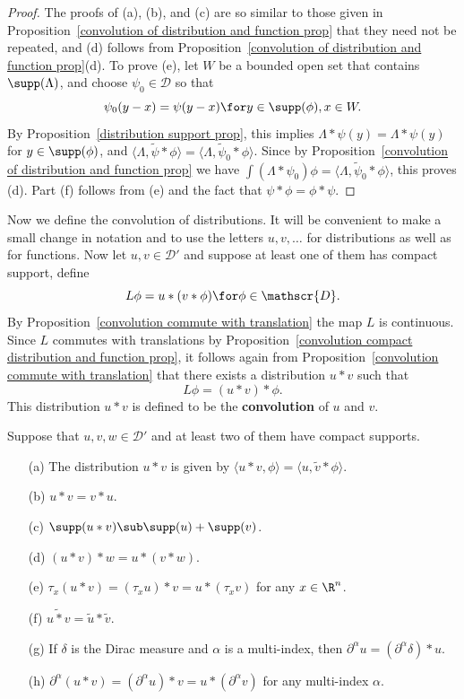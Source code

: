 \begin{proof}
The proofs of (a), (b), and (c) are so similar to those given in Proposition~\ref{convolution of distribution and function prop} that they need not be repeated, and (d) follows from Proposition~\ref{convolution of distribution and function prop}(d). To prove (e), let $W$ be a bounded open set that contains $\supp(\Lambda)$, and choose $\psi_0\in\mathscr{D}$ so that
\[\psi_0(y-x)=\psi(y-x)\for y\in\supp(\phi),x\in W.\]
By Proposition~\ref{distribution support prop}, this implies $\Lambda\ast\psi(y)=\Lambda\ast\psi(y)$ for $y\in\supp(\phi)$, and $\langle\Lambda,\tilde{\psi}\ast\phi\rangle=\langle\Lambda,\tilde{\psi}_0\ast\phi\rangle$. Since by Proposition~\ref{convolution of distribution and function prop} we have $\int(\Lambda\ast\psi_0)\phi=\langle\Lambda,\tilde{\psi}_0\ast\phi\rangle$, this proves (d). Part (f) follows from (e) and the fact that $\psi\ast\phi=\phi\ast\psi$.
\end{proof}
Now we define the convolution of distributions. It will be convenient to make a small change in notation and to use the letters $u,v,\dots$ for distributions as well as for functions. Now let $u,v\in\mathscr{D}'$ and suppose at least one of them has compact support, define
\[L\phi=u\ast(v\ast\phi)\for \phi\in\mathscr{D}.\]
By Proposition~\ref{convolution commute with translation} the map $L$ is continuous. Since $L$ commutes with translations by Proposition~\ref{convolution compact distribution and function prop}, it follows again from Proposition~\ref{convolution commute with translation} that there exists a distribution $u\ast v$ such that
\[L\phi=(u\ast v)\ast\phi.\]
This distribution $u\ast v$ is defined to be the \textbf{convolution} of $u$ and $v$.
\begin{proposition}\label{convolution of distributions prop}
Suppose that $u,v,w\in\mathscr{D}'$ and at least two of them have compact supports.
\begin{itemize}
\item[(a)] The distribution $u\ast v$ is given by $\langle u\ast v,\phi\rangle=\langle u,\tilde{v}\ast\phi\rangle$.
\item[(b)] $u\ast v=v\ast u$.
\item[(c)] $\supp(u\ast v)\sub\supp(u)+\supp(v)$.
\item[(d)] $(u\ast v)\ast w=u\ast(v\ast w)$.
\item[(e)] $\tau_x(u\ast v)=(\tau_xu)\ast v=u\ast(\tau_xv)$ for any $x\in\R^n$.
\item[(f)] $\widetilde{u\ast v}=\tilde{u}\ast\tilde{v}$.  
\item[(g)] If $\delta$ is the Dirac measure and $\alpha$ is a multi-index, then $\partial^\alpha u=(\partial^\alpha\delta)\ast u$. 
\item[(h)] $\partial^\alpha(u\ast v)=(\partial^\alpha u)\ast v=u\ast(\partial^\alpha v)$ for any multi-index $\alpha$.
\end{itemize}
\end{proposition}
